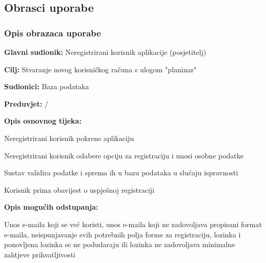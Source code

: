 			\eject 
			
			
				
			\subsection{Obrasci uporabe}
								
				\subsubsection{Opis obrazaca uporabe}
				
					

				
				\noindent {}
			\begin{packed_item}
				
				\item \textbf{Glavni sudionik: }$ $Neregistrirani korisnik aplikacije (posjetitelj)$ $
				\item  \textbf{Cilj:} $ $Stvaranje novog korisničkog računa s ulogom "planinar"$ $
				\item  \textbf{Sudionici:} $ $Baza podataka$ $
				\item  \textbf{Preduvjet:} $ $/$ $
				\item  \textbf{Opis osnovnog tijeka:}
				
				\item[] \begin{packed_enum}
					
					\item $ $Neregistrirani korisnik pokrene aplikaciju$ $
					\item $ $Neregistrirani korisnik odabere opciju za registraciju i unosi osobne podatke$ $
					\item $ $Sustav validira podatke i sprema ih u bazu podataka u slučaju ispravnosti$ $
					\item $ $Korisnik prima obavijest o uspješnoj registraciji$ $
				\end{packed_enum}
				
				\item  \textbf{Opis mogućih odstupanja:}
				
				\item[] \begin{packed_item}
					
					\item[3.a] $ $Unos e-maila koji se već koristi, unos e-maila koji ne zadovoljava propisani format e-maila, neispunjavanje svih potrebnih polja forme za registraciju, lozinka i ponovljena lozinka se ne podudaraju ili lozinka ne zadovoljava minimalne zahtjeve prihvatljivosti$ $
					

\end{packed_item}
\end{packed_item}
